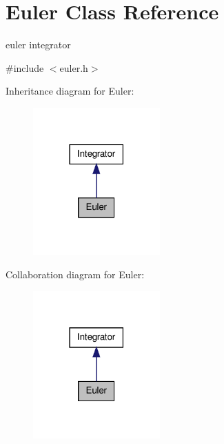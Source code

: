 \hypertarget{classEuler}{\section{\-Euler \-Class \-Reference}
\label{classEuler}
}


euler integrator  




{\ttfamily \#include $<$euler.\-h$>$}



\-Inheritance diagram for \-Euler\-:\nopagebreak
\begin{figure}[H]
\begin{center}
\leavevmode
\includegraphics[width=138pt]{classEuler__inherit__graph}
\end{center}
\end{figure}


\-Collaboration diagram for \-Euler\-:\nopagebreak
\begin{figure}[H]
\begin{center}
\leavevmode
\includegraphics[width=138pt]{classEuler__coll__graph}
\end{center}
\end{figure}
